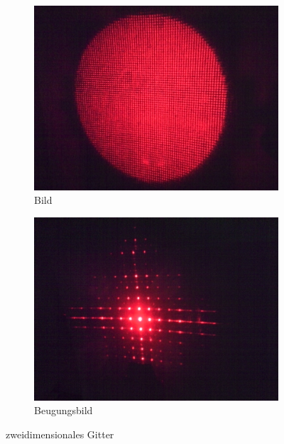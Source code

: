 \begin{figure}[p]
	\centering
	\begin{subfigure}{0.49\textwidth}
		\includegraphics[width=\textwidth]{data/optics/05_Gitter_2D}
		\caption{Bild}
	\end{subfigure}
	\begin{subfigure}{0.49\textwidth}
		\includegraphics[width=\textwidth]{data/optics/05_Gitter_2D_Beugung}
		\caption{Beugungsbild}		 \label{fig:Gitter_2D_BG}
	\end{subfigure}
	\caption{zweidimensionales Gitter}	\label{fig:Gitter_2D}
	\vspace{-5em}
\end{figure}

